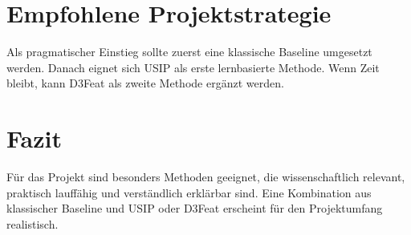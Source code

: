 \documentclass[11pt,a4paper]{article}
\begin{document}
\section{Empfohlene Projektstrategie}
Als pragmatischer Einstieg sollte zuerst eine klassische Baseline umgesetzt werden. Danach eignet sich USIP als erste lernbasierte Methode. Wenn Zeit bleibt, kann D3Feat als zweite Methode ergänzt werden.

\section{Fazit}
Für das Projekt sind besonders Methoden geeignet, die wissenschaftlich relevant, praktisch lauffähig und verständlich erklärbar sind. Eine Kombination aus klassischer Baseline und USIP oder D3Feat erscheint für den Projektumfang realistisch.



\end{document}
